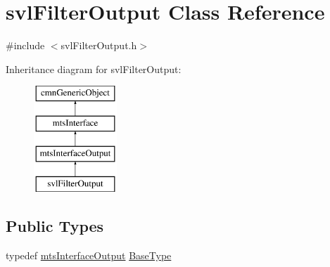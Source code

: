 \hypertarget{classsvl_filter_output}{\section{svl\-Filter\-Output Class Reference}
\label{classsvl_filter_output}
}


{\ttfamily \#include $<$svl\-Filter\-Output.\-h$>$}

Inheritance diagram for svl\-Filter\-Output\-:\begin{figure}[H]
\begin{center}
\leavevmode
\includegraphics[height=4.000000cm]{d6/d26/classsvl_filter_output}
\end{center}
\end{figure}
\subsection*{Public Types}
\begin{DoxyCompactItemize}
\item 
typedef \hyperlink{classmts_interface_output}{mts\-Interface\-Output} \hyperlink{classsvl_filter_output_ac8dd607dba96f25d0ae0c249e293d04f}{Base\-Type}
\end{DoxyCompactItemize}
